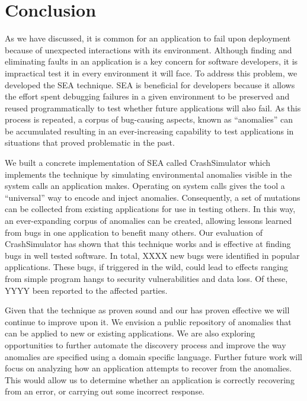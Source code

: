 \section{Conclusion}
\label{SEC:conclusion}

As we have discussed,
it is common for an application 
to fail upon deployment because of unexpected interactions
with its environment.
Although finding and eliminating
faults in an application is a key concern for software developers, it is
impractical test it in every environment it will face.
To address this problem, we developed the SEA
technique.
SEA is beneficial for developers because it allows
the effort spent debugging failures in a given environment
to be preserved and reused programmatically to test whether
future applications will also fail.
As this process is repeated,
a corpus of bug-causing aspects,
known as ``anomalies'' can be accumulated
resulting in an ever-increasing capability
to test applications in situations
that proved problematic in the past.

We built a concrete implementation of SEA
called CrashSimulator which implements
the technique by simulating environmental
anomalies visible in the system calls an application makes.
Operating on system calls gives the tool a ``universal'' way to
encode and inject anomalies. Consequently, a set of mutations can be
collected from existing applications for use in testing others.
In this way, an ever-expanding corpus of anomalies can be
created, allowing lessons learned from bugs in one application to benefit
many others.
Our evaluation of CrashSimulator
has shown that this technique works and is
effective at finding bugs in well tested software.
In total,
XXXX new bugs were identified in popular applications.
These bugs, if triggered in the wild,
could lead to effects ranging from simple program hangs
to security vulnerabilities and data loss.
Of these, YYYY been reported to the
affected parties.

Given that the technique as proven sound
and our has proven effective we will continue to improve upon it.
We envision a public repository of anomalies
that can be applied to new or existing applications.
We are also exploring
opportunities to further automate the discovery process
and improve the way anomalies are specified using a
domain specific language.
Further future work
will focus on analyzing how an
application attempts
to recover from the anomalies.  This would allow
us to determine whether
an application is correctly recovering
from an error, or carrying out some incorrect response.
